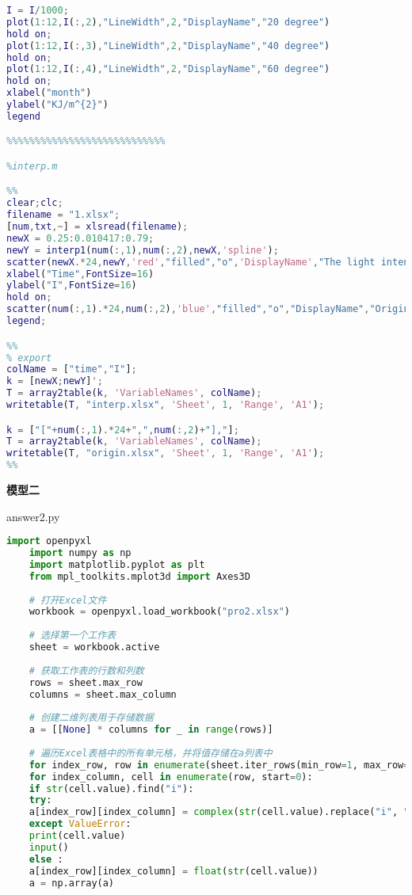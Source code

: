 \documentclass[withoutpreface,bwprint]{cumcmthesis} %
\begin{document}
\begin{appendices}
\begin{lstlisting}[language=matlab]
I = I/1000;
plot(1:12,I(:,2),"LineWidth",2,"DisplayName","20 degree")
hold on;
plot(1:12,I(:,3),"LineWidth",2,"DisplayName","40 degree")
hold on;
plot(1:12,I(:,4),"LineWidth",2,"DisplayName","60 degree")
hold on;
xlabel("month")
ylabel("KJ/m^{2}")
legend

%%%%%%%%%%%%%%%%%%%%%%%%%%%%

%interp.m

%%
clear;clc;
filename = "1.xlsx";
[num,txt,~] = xlsread(filename);
newX = 0.25:0.010417:0.79;
newY = interp1(num(:,1),num(:,2),newX,'spline');
scatter(newX.*24,newY,'red',"filled","o",'DisplayName',"The light intensity with interpolation",SizeData=15);
xlabel("Time",FontSize=16)
ylabel("I",FontSize=16)
hold on;
scatter(num(:,1).*24,num(:,2),'blue',"filled","o","DisplayName","Origin Data",SizeData=20);
legend;

%%
% export
colName = ["time","I"];
k = [newX;newY]';
T = array2table(k, 'VariableNames', colName);
writetable(T, "interp.xlsx", 'Sheet', 1, 'Range', 'A1');

k = ["["+num(:,1).*24+",",num(:,2)+"],"];
T = array2table(k, 'VariableNames', colName);
writetable(T, "origin.xlsx", 'Sheet', 1, 'Range', 'A1');
%%

 \end{lstlisting}


\textbf{模型二}

answer2.py
\begin{lstlisting}[language=python]	
	import openpyxl
	import numpy as np
	import matplotlib.pyplot as plt
	from mpl_toolkits.mplot3d import Axes3D
	
	# 打开Excel文件
	workbook = openpyxl.load_workbook("pro2.xlsx")
	
	# 选择第一个工作表
	sheet = workbook.active
	
	# 获取工作表的行数和列数
	rows = sheet.max_row
	columns = sheet.max_column
	
	# 创建二维列表用于存储数据
	a = [[None] * columns for _ in range(rows)]
	
	# 遍历Excel表格中的所有单元格，并将值存储在a列表中
	for index_row, row in enumerate(sheet.iter_rows(min_row=1, max_row=rows, min_col=1, max_col=columns), start=0):
	for index_column, cell in enumerate(row, start=0):
	if str(cell.value).find("i"):
	try:
	a[index_row][index_column] = complex(str(cell.value).replace("i", "j").replace(' ','')).real
	except ValueError:
	print(cell.value)
	input()
	else :
	a[index_row][index_column] = float(str(cell.value))
	a = np.array(a)
	

\end{lstlisting}
\end{appendices}
\end{document}
